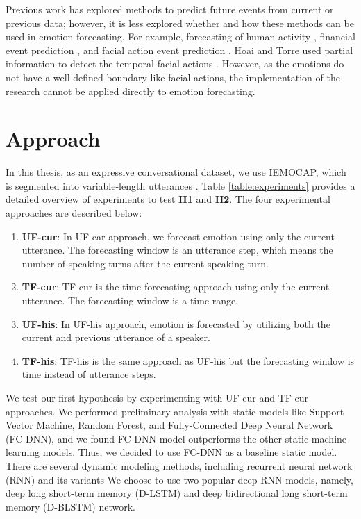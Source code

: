 Previous work has explored methods to predict future events from current or previous data; however, it is less explored whether and how these methods can be used in emotion forecasting. For example, forecasting of human activity \cite{Ryoo:2011:HAP:2355573.2356280}, financial event prediction \cite{TayCao}, and facial action event prediction \cite{MMED}. Hoai and Torre used partial information to detect the temporal facial actions \cite{MMED}. However, as the emotions do not have a well-defined boundary like facial actions, the implementation of the research cannot be applied directly to emotion forecasting. 



\newpage
\section{Approach}
\label{approach}

In this thesis, as an expressive conversational dataset, we use IEMOCAP, which is segmented into variable-length utterances \cite{IEMOCAP}.
Table \ref{table:experiments} provides a detailed overview of experiments to test \textbf{H1} and \textbf{H2}. The four experimental approaches are described below: 
\begin{enumerate}
\item \textbf{UF-cur}: In UF-car approach, we forecast emotion using only the current utterance. The forecasting window is an utterance step, which means the number of speaking turns after the current speaking turn.
\item \textbf{TF-cur}: TF-cur is the time forecasting approach using only the current utterance. The forecasting window is a time range.

\item \textbf{UF-his}: In UF-his approach, emotion is forecasted by utilizing both the current and previous utterance of a speaker.

\item \textbf{TF-his}: TF-his is the same approach as UF-his but the forecasting window is time instead of utterance steps.
 
\end{enumerate}

We test our first hypothesis by experimenting with UF-cur and TF-cur approaches. We performed preliminary analysis with static models like Support Vector Machine, Random Forest, and Fully-Connected Deep Neural Network (FC-DNN), and we found FC-DNN model outperforms the other static machine learning models. Thus, we decided to use FC-DNN as a baseline static model. There are several dynamic modeling methods, including recurrent neural network (RNN) and its variants We choose to use two popular deep RNN models, namely, deep long short-term memory (D-LSTM) and deep bidirectional long short-term memory (D-BLSTM) network. 

